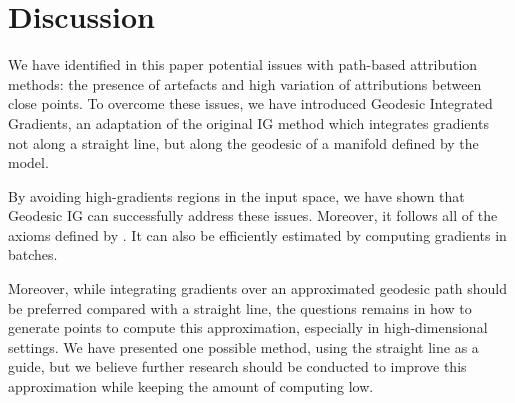 \section{Discussion}
\label{sec:discussion}

We have identified in this paper potential issues with path-based attribution methods: the presence of artefacts and high variation of attributions between close points. To overcome these issues, we have introduced Geodesic Integrated Gradients, an adaptation of the original IG method which integrates gradients not along a straight line, but along the geodesic of a manifold defined by the model.

By avoiding high-gradients regions in the input space, we have shown that Geodesic IG can successfully address these issues. Moreover, it follows all of the axioms defined by \citet{sundararajan2017axiomatic}. It can also be efficiently estimated by computing gradients in batches.

Moreover, while integrating gradients over an approximated geodesic path should be preferred compared with a straight line, the questions remains in how to generate points to compute this approximation, especially in high-dimensional settings. We have presented one possible method, using the straight line as a guide, but we believe further research should be conducted to improve this approximation while keeping the amount of computing low.